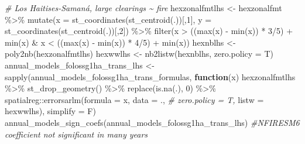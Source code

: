 \documentclass[10pt,landscape,a3paper]{article}
\newenvironment{Shaded}{\begin{snugshade}}{\end{snugshade}}
\newcommand{\AttributeTok}[1]{\textcolor[rgb]{0.77,0.63,0.00}{#1}}
\newcommand{\CommentTok}[1]{\textcolor[rgb]{0.56,0.35,0.01}{\textit{#1}}}
\newcommand{\ControlFlowTok}[1]{\textcolor[rgb]{0.13,0.29,0.53}{\textbf{#1}}}
\newcommand{\DecValTok}[1]{\textcolor[rgb]{0.00,0.00,0.81}{#1}}
\newcommand{\FunctionTok}[1]{\textcolor[rgb]{0.00,0.00,0.00}{#1}}
\newcommand{\NormalTok}[1]{#1}
\newcommand{\OtherTok}[1]{\textcolor[rgb]{0.56,0.35,0.01}{#1}}
\newcommand{\SpecialCharTok}[1]{\textcolor[rgb]{0.00,0.00,0.00}{#1}}
\begin{document}
\begin{Shaded}
\begin{Highlighting}[]
\CommentTok{\# Los Haitises{-}Samaná, large clearings \textasciitilde{} fire}
\NormalTok{hexzonalfmtlhs }\OtherTok{\textless{}{-}}\NormalTok{ hexzonalfmt }\SpecialCharTok{\%\textgreater{}\%}
  \FunctionTok{mutate}\NormalTok{(}\AttributeTok{x =} \FunctionTok{st\_coordinates}\NormalTok{(}\FunctionTok{st\_centroid}\NormalTok{(.))[,}\DecValTok{1}\NormalTok{], }\AttributeTok{y =} \FunctionTok{st\_coordinates}\NormalTok{(}\FunctionTok{st\_centroid}\NormalTok{(.))[,}\DecValTok{2}\NormalTok{]) }\SpecialCharTok{\%\textgreater{}\%}
  \FunctionTok{filter}\NormalTok{(x }\SpecialCharTok{\textgreater{}}\NormalTok{ ((}\FunctionTok{max}\NormalTok{(x) }\SpecialCharTok{{-}} \FunctionTok{min}\NormalTok{(x)) }\SpecialCharTok{*} \DecValTok{3}\SpecialCharTok{/}\DecValTok{5}\NormalTok{) }\SpecialCharTok{+} \FunctionTok{min}\NormalTok{(x) }\SpecialCharTok{\&}\NormalTok{ x }\SpecialCharTok{\textless{}}\NormalTok{ ((}\FunctionTok{max}\NormalTok{(x) }\SpecialCharTok{{-}} \FunctionTok{min}\NormalTok{(x)) }\SpecialCharTok{*} \DecValTok{4}\SpecialCharTok{/}\DecValTok{5}\NormalTok{) }\SpecialCharTok{+} \FunctionTok{min}\NormalTok{(x))}
\NormalTok{hexnblhs }\OtherTok{\textless{}{-}} \FunctionTok{poly2nb}\NormalTok{(hexzonalfmtlhs)}
\NormalTok{hexwwlhs }\OtherTok{\textless{}{-}} \FunctionTok{nb2listw}\NormalTok{(hexnblhs, }\AttributeTok{zero.policy =}\NormalTok{ T)}
\NormalTok{annual\_models\_folossg1ha\_trans\_lhs }\OtherTok{\textless{}{-}} \FunctionTok{sapply}\NormalTok{(annual\_models\_folossg1ha\_trans\_formulas,}
                        \ControlFlowTok{function}\NormalTok{(x)}
\NormalTok{                          hexzonalfmtlhs }\SpecialCharTok{\%\textgreater{}\%}
                          \FunctionTok{st\_drop\_geometry}\NormalTok{() }\SpecialCharTok{\%\textgreater{}\%}
                          \FunctionTok{replace}\NormalTok{(}\FunctionTok{is.na}\NormalTok{(.), }\DecValTok{0}\NormalTok{) }\SpecialCharTok{\%\textgreater{}\%}
\NormalTok{                          spatialreg}\SpecialCharTok{::}\FunctionTok{errorsarlm}\NormalTok{(}\AttributeTok{formula =}\NormalTok{ x,}
                                                 \AttributeTok{data =}\NormalTok{ ., }\CommentTok{\# zero.policy = T,}
                                                 \AttributeTok{listw =}\NormalTok{ hexwwlhs),}
                        \AttributeTok{simplify =}\NormalTok{ F)}
\FunctionTok{annual\_models\_sign\_coefs}\NormalTok{(annual\_models\_folossg1ha\_trans\_lhs) }\CommentTok{\#NFIRESM6 coefficient not significant in many years}


\end{Highlighting}
\end{Shaded}
\end{document}
